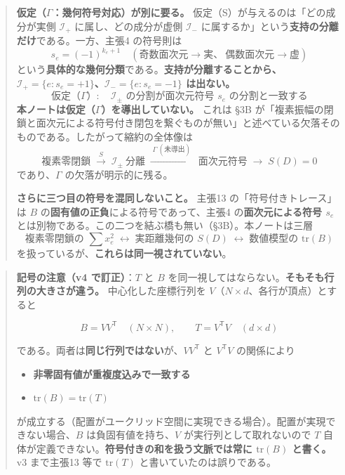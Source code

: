 \documentclass[
  10pt,
]{ltjsarticle}
\providecommand{\tightlist}{%
  \setlength{\itemsep}{0pt}\setlength{\parskip}{0pt}}
\begin{document}
\begin{quote}
\textbf{仮定（\(\Gamma\)：幾何符号対応）が別に要る。}
仮定（S）が与えるのは「どの成分が実側 \(\mathcal{I}_+\)
に属し、どの成分が虚側 \(\mathcal{I}_-\)
に属するか」という\textbf{支持の分離だけ}である。一方、主張4 の符号則は
\[s_e = (-1)^{k_e+1} \quad(\text{奇数面次元} \to \text{実}、\ \text{偶数面次元} \to \text{虚})\]
という\textbf{具体的な幾何分類}である。\textbf{支持が分離することから、\(\mathcal{I}_+ = \{e : s_e=+1\}\)、\(\mathcal{I}_- = \{e : s_e=-1\}\)
は出ない。}
\[\text{仮定（$\Gamma$）}:\quad \mathcal{I}_\pm \text{ の分割が面次元符号 } s_e \text{ の分割と一致する}\]
\textbf{本ノートは仮定（\(\Gamma\)）を導出していない。} これは §3B
が「複素振幅の閉鎖と面次元による符号付き閉包を繋ぐものが無い」と述べている欠落そのものである。したがって縮約の全体像は
\[\text{複素零閉鎖} \;\xrightarrow{\;S\;}\; \mathcal{I}_\pm\ \text{分離} \;\xrightarrow{\;\Gamma\ (\textbf{未導出})\;}\; \text{面次元符号} \;\longrightarrow\; S(D)=0\]
であり、\(\Gamma\) の欠落が明示的に残る。

\textbf{さらに三つ目の符号を混同しないこと。} 主張13
の「符号付きトレース」は \(B\)
の\textbf{固有値の正負}による符号であって、主張4
の\textbf{面次元による符号 \(s_e\)}
とは別物である。この二つを結ぶ橋も無い（§3B）。本ノートは三層
\[\text{複素零閉鎖の } \sum x_e^2 \;\longleftrightarrow\; \text{実距離幾何の } S(D) \;\longleftrightarrow\; \text{数値模型の } \mathrm{tr}(B)\]
を扱っているが、\textbf{これらは同一視されていない}。
\end{quote}

\begin{quote}
\textbf{記号の注意（v4 で訂正）}：\(T\) と \(B\)
を同一視してはならない。\textbf{そもそも行列の大きさが違う。}
中心化した座標行列を \(V\)（\(N \times d\)、各行が頂点）とすると

\[B = VV^{\mathsf T} \quad (N \times N), \qquad T = V^{\mathsf T}V \quad (d \times d)\]

である。両者は\textbf{同じ行列ではない}が、\(VV^{\mathsf T}\) と
\(V^{\mathsf T}V\) の関係により

\begin{itemize}
\tightlist
\item
  \textbf{非零固有値が重複度込みで一致する}
\item
  \textbf{\(\mathrm{tr}(B) = \mathrm{tr}(T)\)}
\end{itemize}

が成立する（配置がユークリッド空間に実現できる場合）。配置が実現できない場合、\(B\)
は負固有値を持ち、\(V\) が実行列として取れないので \(T\)
自体が定義できない。\textbf{符号付きの和を扱う文脈では常に
\(\mathrm{tr}(B)\) と書く。} v3 まで主張13 等で \(\mathrm{tr}(T)\)
と書いていたのは誤りである。
\end{quote}
\end{document}
